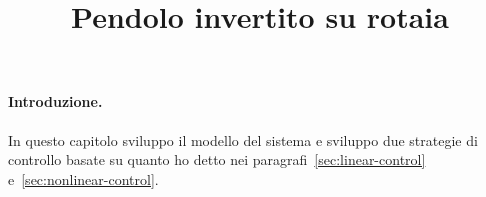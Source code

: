 \title{Pendolo invertito su rotaia}
\maketitle
\label{sec:pic}

\paragraph{Introduzione.}
In questo capitolo sviluppo il modello del sistema e sviluppo due strategie di controllo
basate su quanto ho detto nei paragrafi~\ref{sec:linear-control} e~\ref{sec:nonlinear-control}.
 




